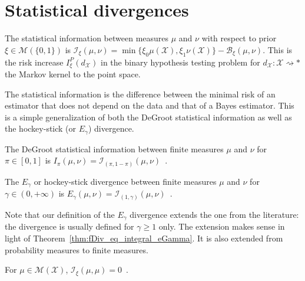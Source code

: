 
\section{Statistical divergences}

\begin{definition}
  \label{def:statInfo}
  \leanok
  The statistical information between measures $\mu$ and $\nu$ with respect to prior $\xi \in \mathcal M(\{0,1\})$ is
  $\mathcal I_\xi(\mu, \nu) = \min\{\xi_0 \mu(\mathcal X), \xi_1 \nu(\mathcal X)\} - \mathcal B_\xi(\mu, \nu)$.
  This is the risk increase $I_\xi^P(d_{\mathcal X})$ in the binary hypothesis testing problem for $d_{\mathcal X} : \mathcal X \rightsquigarrow *$ the Markov kernel to the point space.
\end{definition}

The statistical information is the difference between the minimal risk of an estimator that does not depend on the data and that of a Bayes estimator.
This is a simple generalization of both the DeGroot statistical information as well as the hockey-stick (or $E_\gamma$) divergence.

\begin{definition}
  \label{def:deGrootInfo}
  \leanok
  The DeGroot statistical information between finite measures $\mu$ and $\nu$ for $\pi \in [0,1]$ is $I_\pi (\mu, \nu) = \mathcal I_{(\pi, 1 - \pi)}(\mu, \nu)$~.
\end{definition}

\begin{definition}
  \label{def:eGamma}
  \leanok
  The $E_\gamma$ or hockey-stick divergence between finite measures $\mu$ and $\nu$ for $\gamma \in (0,+\infty)$ is $E_\gamma(\mu, \nu) = \mathcal I_{(1,\gamma)}(\mu, \nu)$~.
\end{definition}

Note that our definition of the $E_\gamma$ divergence extends the one from the literature: the divergence is usually defined for $\gamma \ge 1$ only.
The extension makes sense in light of Theorem~\ref{thm:fDiv_eq_integral_eGamma}.
It is also extended from probability measures to finite measures.

\begin{lemma}
  \label{lem:statInfo_self}
  \leanok
  For $\mu \in \mathcal M(\mathcal X)$, $\mathcal I_\xi(\mu, \mu) = 0$~.
\end{lemma}

